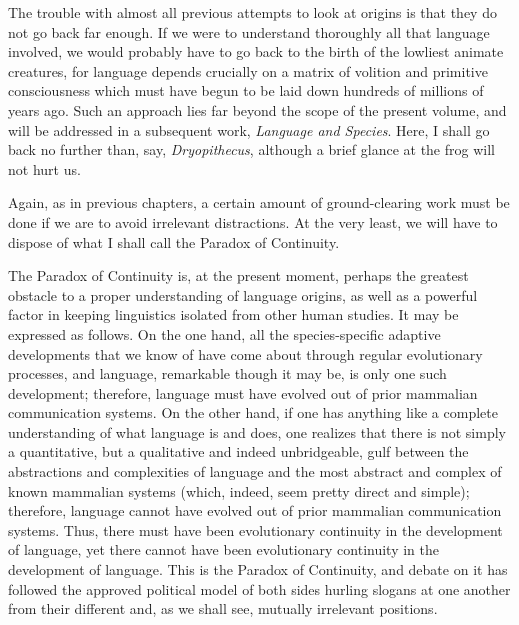 The trouble with almost all previous attempts to look at origins is that they do not go back far enough. If we were to understand thoroughly all that language involved, we would probably have to go back to the birth of the lowliest animate creatures, for language depends crucially on a matrix of volition and primitive consciousness which must have begun to be laid down hundreds of millions of years ago. Such an approach lies far beyond the scope of the present volume, and will be addressed in a subsequent work, \textit{Language and Species}. Here, I shall go back no further than, say, \textit{Dryopithecus}, although a brief glance at the frog will not hurt us.

Again, as in previous chapters, a certain amount of ground-clearing work must be done if we are to avoid irrelevant distractions. At the very least, we will have to dispose of what I shall call the Paradox of Continuity.

The Paradox of Continuity is, at the present moment, perhaps the greatest obstacle to a proper understanding of language origins, as well as a powerful factor in keeping linguistics isolated from other human studies. It may be expressed as follows. On the one hand, all the species-specific adaptive developments that we know of have come about through regular evolutionary processes, and language, remarkable though it may be, is only one such development; therefore, language must have evolved out of prior mammalian communication systems. On the other hand, if one has anything like a complete understanding of what language is and does, one realizes that there is not simply a quantitative, but a qualitative and indeed unbridgeable, gulf between
the abstractions and complexities of language and the most abstract and complex of known mammalian systems (which, indeed, seem pretty direct and simple); therefore, language cannot have evolved out of prior mammalian communication systems. Thus, there must have been evolutionary continuity in the development of language, yet there cannot have been evolutionary continuity in the development of language. This is the Paradox of Continuity, and debate on it has followed the approved political model of both sides hurling slogans at one another from their different and, as we shall see, mutually irrele\-vant positions.\\\\

